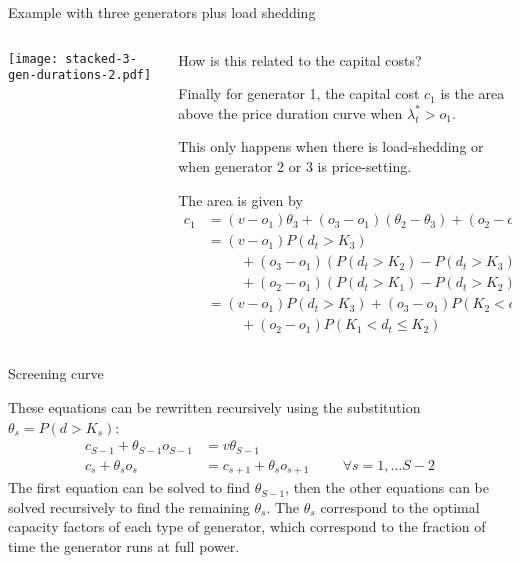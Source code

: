\documentclass[10pt,aspectratio=169,dvipsnames]{beamer}
\def\l{\lambda}
\begin{document}
\begin{frame}{Example with three generators plus load shedding}

\begin{columns}[T]
  \begin{column}{6cm}

\texttt{[image: stacked-3-gen-durations-2.pdf]}

  \end{column}
  \begin{column}{8cm}

    How is this related to the capital costs?

    \vspace{0.5cm}

    Finally for generator 1, the capital cost $c_1$ is the area above the price duration curve when $\l_t^* > o_1$.

    This only happens when there is load-shedding or when generator 2 or 3 is price-setting.

    The area is given by
    \begin{align*}
      c_1 &  = (v - o_1) \theta_3 + (o_3 - o_1) (\theta_2 - \theta_3)  + (o_2 - o_1) (\theta_1 - \theta_2)  \\
      & = (v - o_1) P(d_t > K_3) \\
       & \hspace{1cm}+ (o_3 - o_1) \left(P(d_t > K_2) - P(d_t > K_3)\right) \\
       & \hspace{1cm}+ (o_2 - o_1) \left(P(d_t > K_1) - P(d_t > K_2)\right) \\
      & = (v - o_1) P(d_t > K_3) + (o_3 - o_1) P(K_2 < d_t\leq K_3) \\
       & \hspace{1cm}+ (o_2 - o_1) P(K_1 < d_t\leq K_2)
    \end{align*}
  \end{column}

\end{columns}

\end{frame}


\begin{frame}{Screening curve}

  These equations can be rewritten recursively using the substitution
  $\theta_s = P(d > K_s)$:
  \begin{align*}
    c_{S-1} + \theta_{S-1} o_{S-1} &= v\theta_{S-1} \\
    c_s + \theta_s o_s &= c_{s+1} + \theta_s o_{s+1} \hspace{1cm} \forall s = 1, \dots S-2
  \end{align*}
  The first equation can be solved to find $\theta_{S-1}$, then the other equations can be solved recursively to find the remaining $\theta_s$. The $\theta_s$ correspond to the optimal \alert{capacity factors} of each type of generator, which correspond to the fraction  of time the generator runs at full power.

\end{frame}
\end{document}
